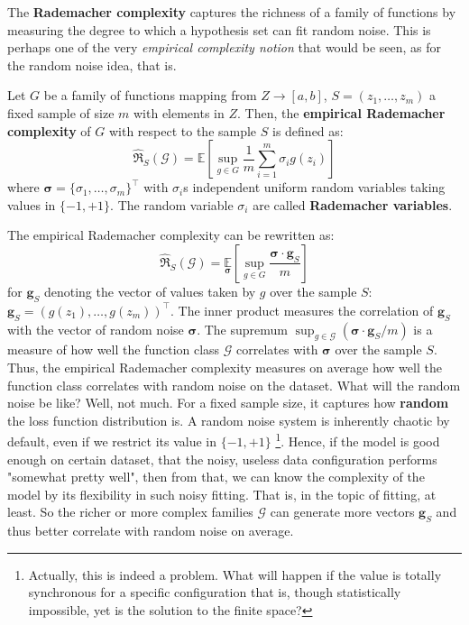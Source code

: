 The \textbf{Rademacher complexity} captures the richness of a family of functions by measuring the degree to which a hypothesis set can fit random noise. This is perhaps one of the very \textit{empirical complexity notion} that would be seen, as for the random noise idea, that is. 

Let $G$ be a family of functions mapping from $Z\to [a,b]$, $S=(z_1,\dots, z_m)$ a fixed sample of size $m$ with elements in $Z$. Then, the \textbf{empirical Rademacher complexity} of $G$ with respect to the sample $S$ is defined as:
\begin{equation*}
    \hat{\mathfrak{R}}_S (\mathcal{G}) = \mathbb{E} \left[ \sup_{g\in G} \frac{1}{m} \sum^{m}_{i=1} \sigma_i g(z_i) \right]
\end{equation*}
where $\bm{\sigma}=\{\sigma_1,\dots,\sigma_m\}^{\top}$ with $\sigma_i$s independent uniform random variables taking values in $\{-1,+1\}$. The random variable $\sigma_i$ are called \textbf{Rademacher variables}. 

The empirical Rademacher complexity can be rewritten as:
$$\hat{\mathfrak{R}}_S (\mathcal{G}) = \underset{\mathbf{\sigma}}{\mathbb{E}} \left[\sup_{g \in G} \frac{\bm{\sigma}\cdot \mathbf{g}_S}{m}\right]$$
for $\mathbf{g}_S$ denoting the vector of values taken by $g$ over the sample $S$: $\mathbf{g}_{S} = (g(z_1),\dots,g(z_{m}))^{\top}$. The inner product measures the correlation of $\mathbf{g}_{S}$ with the vector of random noise $\bm{\sigma}$. The supremum $\sup_{g\in \mathcal{G}} (\bm{\sigma}\cdot \mathbf{g}_{S}/m)$ is a measure of how well the function class $\mathcal{G}$ correlates with $\bm{\sigma}$ over the sample $S$. Thus, the empirical Rademacher complexity measures on average how well the function class correlates with random noise on the dataset. What will the random noise be like? Well, not much. For a fixed sample size, it captures how \textbf{random} the loss function distribution is. A random noise system is inherently chaotic by default, even if we restrict its value in $\{-1,+1\}$ \footnote{Actually, this is indeed a problem. What will happen if the value is totally synchronous for a specific configuration that is, though statistically impossible, yet is the solution to the finite space?}. Hence, if the model is good enough on certain dataset, that the noisy, useless data configuration performs "somewhat pretty well", then from that, we can know the complexity of the model by its flexibility in such noisy fitting. That is, in the topic of fitting, at least. So the richer or more complex families $\mathcal{G}$ can generate more vectors $\mathbf{g}_{S}$ and thus better correlate with random noise on average. 

